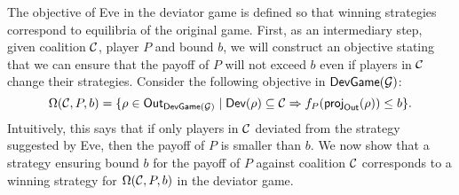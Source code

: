 
The objective of Eve in the deviator game is defined so that winning
strategies correspond to equilibria of the original game. First, as an
intermediary step, given coalition \(\mathcal{C}\), player \(P\) and
bound \(b\), we will construct an objective stating that we can ensure
that the payoff of $P$ will not exceed $b$ even if players in $\mathcal{C}$ change
their strategies.
Consider the following objective in \(\textsf{DevGame}(\mathcal{G})\):
\[
  \Omega(\mathcal{C}, P, b) = \{\rho \in \textsf{Out}_{\textsf{DevGame}(\mathcal{G})} \mid \textsf{Dev}(\rho) \subseteq \mathcal{C} \Rightarrow f_P(\textsf{proj}_{\textsf{Out}}(\rho)) \le b\}.
\]
Intuitively, this says that if only players
in $\mathcal{C}$ deviated from the strategy suggested by Eve, then the payoff
of $P$ is smaller than $b$.
We now show that a strategy ensuring bound \(b\) for the payoff of
$P$ against coalition \(\mathcal{C}\) corresponds to a winning strategy for
\(\Omega(\mathcal{C}, P, b)\) in the deviator game.

